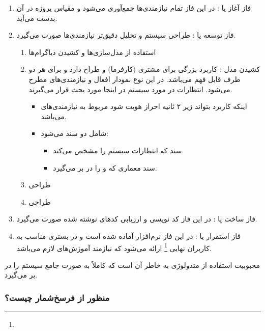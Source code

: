 \documentclass[a4paper]{article}
\begin{document}
\begin{enumerate}
    \item فاز آغاز یا : در این فاز تمام نیازمندی‌ها جمع‌آوری
    می‌شود و مقیاس پروژه در آن بدست می‌آید.
    \item فاز توسعه یا : طراحی سیستم و تحلیل دقیق‌تر نیازمندی‌ها
    صورت می‌گیرد.
    \begin{enumerate}
        \item استفاده از مدل‌سازی‌ها و کشیدن دیاگرام‌ها
        \item کشیدن مدل : کاربرد بزرگی برای مشتری (کارفرما) و طراح
        دارد و برای هر دو طرف قابل فهم می‌باشد. در این نوع نمودار افعال و
        نیازمندی‌های  مطرح می‌شود. انتظارات در مورد سیستم در
        اینجا مورد بحث قرار می‌گیرند.
        \begin{itemize}
            \item اینکه کاربرد بتواند زیر ۲ ثانیه احراز هویت شود مربوط به
            نیازمندی‌های  می‌باشد.
            \item شامل دو سند می‌شود:
            \begin{itemize}
                \item سند  که انتظارات سیستم را مشخص می‌کند.
                \item سند معماری که  و  را در بر
                می‌گیرد.
            \end{itemize}
        \end{itemize}
        \item طراحی  
        \item طراحی 
    \end{enumerate}
    \item فاز ساخت یا : در این فاز کد نویسی و ارزیابی کد‌های
    نوشته شده صورت می‌گیرد.
    \item فاز استقرار یا : در این فاز نرم‌افزار آماده شده است و
    در بستری مناسب به کاربران نهایی \footnote{} ارائه می‌شود که
    نیازمند آموزش‌های لازم می‌باشد.
\end{enumerate}

محبوبیت استفاده از متدولوژی  به خاطر آن است که کاملاً به صورت جامع سیستم
را در بر می‌گیرد.

\subsubsection{منظور از فرسخ‌شمار چیست؟}
\end{document}
